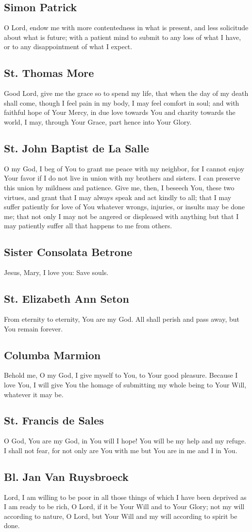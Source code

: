 \documentclass[12pt]{article}
\newcommand{\prayertitle}[1]{\subsection{#1}}
\begin{document}
\prayertitle{Simon Patrick}
O Lord, endow me with more contentedness in what is present, and less solicitude about what is future;
with a patient mind to submit to any loss of what I have, or to  any disappointment of what I expect.

\prayertitle{St. Thomas More}
Good Lord, give me the grace so to spend my life, that when the day of my death shall come, though I feel pain in my body, I may feel comfort in soul;
and with faithful hope of Your Mercy, in due love towards You and charity towards the world, I may, through Your Grace, part hence into Your Glory.

\prayertitle{St. John Baptist de La Salle}
O my God, I beg of You to grant me peace with my neighbor, for I cannot enjoy Your favor if I do not live in union with my brothers and sisters.
I can preserve this union by mildness and patience.
Give me, then, I beseech You, these two virtues, and grant that I may always speak and act kindly to all;
that I may suffer patiently for love of You whatever wrongs, injuries, or insults may be done me;
that not only I may not be angered or displeased with anything but that I may patiently suffer all that happens to me from others.

\prayertitle{Sister Consolata Betrone}
Jesus, Mary, I love you: Save souls.

\prayertitle{St. Elizabeth Ann Seton}
From eternity to eternity, You are my God.
All shall perish and pass away, but You remain forever.

\prayertitle{Columba Marmion}
Behold me, O my God, I give myself to You, to Your good pleasure.
Because I love You, I will give You the homage of submitting my whole being to Your Will, whatever it may be.

\prayertitle{St. Francis de Sales}
O God, You are my God, in You will I hope!
You will be my help and my refuge.
I shall not fear, for not only are You with me but You are in me and I in You.

\prayertitle{Bl. Jan Van Ruysbroeck}
Lord, I am willing to be poor in all those things of which I have been deprived as I am ready to be rich, O Lord, if it be Your Will and to Your Glory;
not my will according to nature, O Lord, but Your Will and my will according to spirit be done.

\newpage
\end{document}
